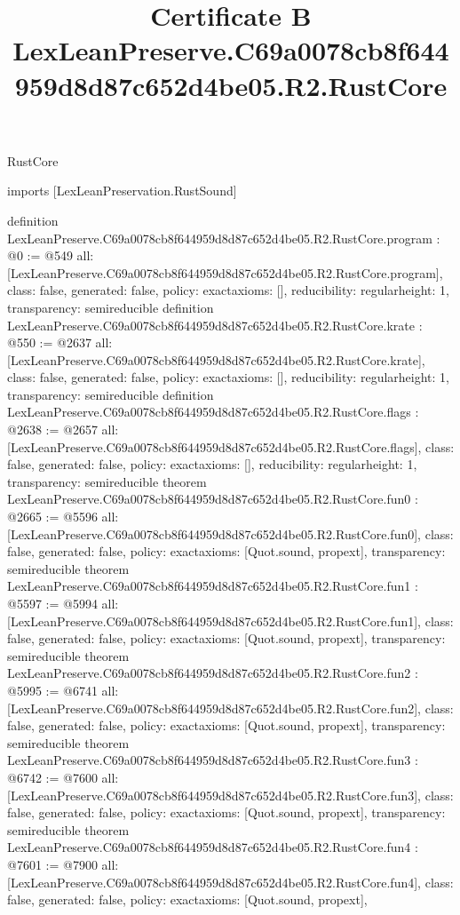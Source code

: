 \begin{lexlean}{RustCore}
\title{Certificate B LexLeanPreserve.C69a0078cb8f644959d8d87c652d4be05.R2.RustCore}
\begin{coremodule}
imports [LexLeanPreservation.RustSound]

definition LexLeanPreserve.C69a0078cb8f644959d8d87c652d4be05.R2.RustCore.program : @0 := @549 {
  all: [LexLeanPreserve.C69a0078cb8f644959d8d87c652d4be05.R2.RustCore.program],
  class: false,
  generated: false,
  policy: exact{axioms: []},
  reducibility: regular{height: 1},
  transparency: semireducible
}
definition LexLeanPreserve.C69a0078cb8f644959d8d87c652d4be05.R2.RustCore.krate : @550 := @2637 {
  all: [LexLeanPreserve.C69a0078cb8f644959d8d87c652d4be05.R2.RustCore.krate],
  class: false,
  generated: false,
  policy: exact{axioms: []},
  reducibility: regular{height: 1},
  transparency: semireducible
}
definition LexLeanPreserve.C69a0078cb8f644959d8d87c652d4be05.R2.RustCore.flags : @2638 := @2657 {
  all: [LexLeanPreserve.C69a0078cb8f644959d8d87c652d4be05.R2.RustCore.flags],
  class: false,
  generated: false,
  policy: exact{axioms: []},
  reducibility: regular{height: 1},
  transparency: semireducible
}
theorem LexLeanPreserve.C69a0078cb8f644959d8d87c652d4be05.R2.RustCore.fun0 : @2665 := @5596 {
  all: [LexLeanPreserve.C69a0078cb8f644959d8d87c652d4be05.R2.RustCore.fun0],
  class: false,
  generated: false,
  policy: exact{axioms: [Quot.sound, propext]},
  transparency: semireducible
}
theorem LexLeanPreserve.C69a0078cb8f644959d8d87c652d4be05.R2.RustCore.fun1 : @5597 := @5994 {
  all: [LexLeanPreserve.C69a0078cb8f644959d8d87c652d4be05.R2.RustCore.fun1],
  class: false,
  generated: false,
  policy: exact{axioms: [Quot.sound, propext]},
  transparency: semireducible
}
theorem LexLeanPreserve.C69a0078cb8f644959d8d87c652d4be05.R2.RustCore.fun2 : @5995 := @6741 {
  all: [LexLeanPreserve.C69a0078cb8f644959d8d87c652d4be05.R2.RustCore.fun2],
  class: false,
  generated: false,
  policy: exact{axioms: [Quot.sound, propext]},
  transparency: semireducible
}
theorem LexLeanPreserve.C69a0078cb8f644959d8d87c652d4be05.R2.RustCore.fun3 : @6742 := @7600 {
  all: [LexLeanPreserve.C69a0078cb8f644959d8d87c652d4be05.R2.RustCore.fun3],
  class: false,
  generated: false,
  policy: exact{axioms: [Quot.sound, propext]},
  transparency: semireducible
}
theorem LexLeanPreserve.C69a0078cb8f644959d8d87c652d4be05.R2.RustCore.fun4 : @7601 := @7900 {
  all: [LexLeanPreserve.C69a0078cb8f644959d8d87c652d4be05.R2.RustCore.fun4],
  class: false,
  generated: false,
  policy: exact{axioms: [Quot.sound, propext]},
}
\end{coremodule}
\end{lexlean}

